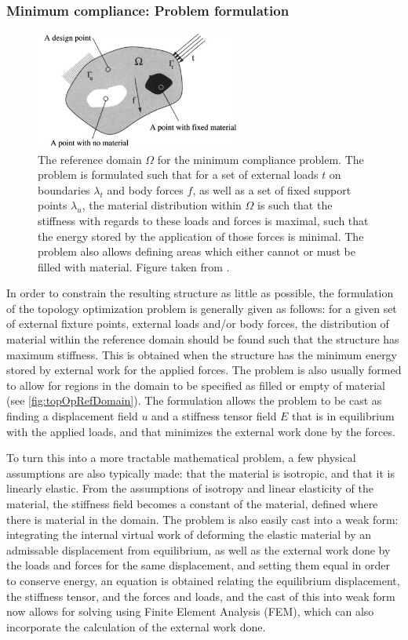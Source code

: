 \subsubsection{Minimum compliance: Problem formulation}
\begin{figure}
\centering
\includegraphics[width=0.6\textwidth]{Pictures/TopOp/design_domain.png}
\caption{The reference domain $\Omega$ for the minimum compliance problem. The problem is formulated such that for a set of external loads $t$ on boundaries $\lambda_t$ and body forces $f$, as well as a set of fixed support points $\lambda_u$, the material distribution within $\Omega$ is such that the stiffness with regards to these loads and forces is maximal, such that the energy stored by the application of those forces is minimal. The problem also allows defining areas which either cannot or must be filled with material. Figure taken from \cite{bendsoe2003topology}.}
\label{fig:topOpRefDomain}
\end{figure}
In order to constrain the resulting structure as little as possible, the formulation of the topology optimization problem is generally given as follows: for a given set of external fixture points, external loads and/or body forces, the distribution of material within the reference domain should be found such that the structure has maximum stiffness. This is obtained when the structure has the minimum energy stored by external work for the applied forces. The problem is also usually formed to allow for regions in the domain to be specified as filled or empty of material (see \autoref{fig:topOpRefDomain}). The formulation allows the problem to be cast as finding a displacement field $u$ and a stiffness tensor field $E$ that is in equilibrium with the applied loads, and that minimizes the external work done by the forces. 

To turn this into a more tractable mathematical problem, a few physical assumptions are also typically made: that the material is isotropic, and that it is linearly elastic. From the assumptions of isotropy and linear elasticity of the material, the stiffness field becomes a constant of the material, defined where there is material in the domain. The problem is also easily cast into a weak form: integrating the internal virtual work of deforming the elastic material by an admissable displacement from equilibrium, as well as the external work done by the loads and forces for the same displacement, and setting them equal in order to conserve energy, an equation is obtained relating the equilibrium displacement, the stiffness tensor, and the forces and loads, and the cast of this into weak form now allows for solving using Finite Element Analysis (FEM), which can also incorporate the calculation of the external work done.

